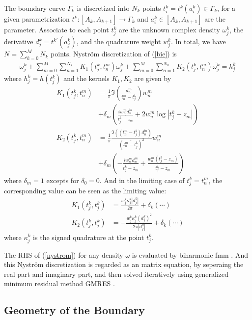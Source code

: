 \documentclass[10pt,twocolumn]{article}
\begin{document}
The boundary curve $\Gamma_k$ is discretized into $N_k$ points $t^k_i = t^k(a^k_i)\in \Gamma_k$, 
for a given parametrization $t^k: [A_k,A_{k+1}] \to \Gamma_k$ and $a^k_i\in [A_k, A_{k+1}]$ are the parameter. 
Associate to each point $t^k_j$ are the unknown complex density $\omega^k_j$, 
the derivative $d^k_j = t^{k\prime}(a^k_j)$, 
and the quadrature weight $w^k_j$. In total, we have $N= \sum_{k=0}^M N_k$ points. Nystr\"om discretization of (\ref{bie}) is
\begin{align}
  \omega_j^k 
  + \sum_{m=0}^{M}\sum_{n=1}^{N_k} K_1(t^k_j,t^m_n) \omega^k_j 
  + \sum_{m=0}^{M}\sum_{n=1}^{N_k} K_2(t^k_j,t^m_n) \overline{\omega^k_j} = h^k_j
  \label{nystrom}
\end{align} where $h^k_j = h(t^k_j)$ and the kernels $K_1, K_2$ are given by 
\begin{align}
  K_1(t^k_j, t^m_n) 
  &= \frac{1}{\pi} \Im (\frac{d^m_n}{t^m_n-t^k_j})w^m_n \\
  &+ \delta_m\left(\frac{iw^m_n\overline{d^m_n}}{\overline{t^k_j - z_m}}
  + 2w^m_n \log |t^k_j - z_m| \right)\nonumber \\
  K_2(t^k_j, t^m_n) 
  &= \frac{1}{\pi} \frac{\Im((t^m_n-t^k_j)\overline{d^m_n})}{(\overline{t^m_n - t^k_j})^2} w^m_n  \\
  & + \delta_{m} \left(- \frac{iw^m_n d^m_n}{\overline{t^k_j - z_m}} + \frac{w^m_n(t^k_j-z_m)}{\overline{t^k_j - z_m}}\right) \nonumber
\end{align}
where $\delta_m = 1$ excepts for $\delta_0 = 0$. And in the limiting case of $t^k_j = t^m_n$, the corresponding value can be seen as the limiting value:
\begin{align}
  K_1(t^k_j, t^k_j) &= \frac{w^k_j \kappa^k_j|d^k_j|}{2\pi} + \delta_{k}(\cdots)\\
  K_2(t^k_j, t^k_j) &= -\frac{w^k_j\kappa^k_j(d^k_j)^2}{2\pi|d^k_j|} + \delta_k(\cdots)
\end{align}where $\kappa^k_j$ is the signed quadrature at the point $t^k_j$. 

The RHS of (\ref{nystrom}) for any density $\omega$ is evaluated by biharmonic fmm \cite{FlatironinstituteFmm2d2022} . And this Nystr\"om discretization is regarded as an matrix equation, by seperaing the real part and imaginary part, and then solved iteratively using generalized minimum residual method GMRES \cite{saad_gmres_1986}. 



\subsection{Geometry of the Boundary}
\end{document}
